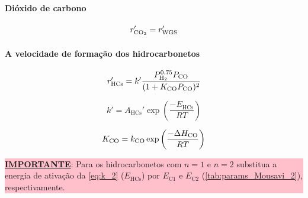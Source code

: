 \documentclass[portuguese,12pt,a4paper,onecolumn]{article}
\begin{document}
	\paragraph{Dióxido de carbono}
	\begin{equation}
		r_{\ce{CO2}}' = r_{\mathrm{WGS}}'
	\end{equation}
	
	\paragraph{A velocidade de formação dos hidrocarbonetos}
	
	\begin{equation}
		r_\mathrm{HCs}' = k' \frac{P_{\ce{H2}}^{0.75} P_{\ce{CO}}}{(1 + K_{\ce{CO}} P_{\ce{CO}})^2}
		\label{eq:r_HCs_2}
	\end{equation}
	
	\begin{equation}
		k' = A_\mathrm{HCs}' \exp \left( \frac{-E_\mathrm{HCs}}{RT} \right)
		\label{eq:k_2}
	\end{equation}
	
	\begin{equation}
		K_{\ce{CO}} = k_{\ce{CO}} \exp \left( \frac{-\Delta H_{\ce{CO}}}{RT} \right)
		\label{eq:K_CO_2}
	\end{equation}
	
	\colorbox{pink}{\parbox{\textwidth}{
			\textbf{\underline{IMPORTANTE}}: Para os hidrocarbonetos com $n = 1$ e $n = 2$ substitua a energia de ativação da \autoref{eq:k_2} ($E_\mathrm{HCs}$) por $E_{\mathrm{C1}}$ e $E_{\mathrm{C2}}$ (\autoref{tab:params_Mousavi_2}), respectivamente.
	}}
	
	\begin{table}[!h]
		\centering
		\caption{Parâmetros das Equações \ref{eq:r_HCs_2}, \ref{eq:k_2} e \ref{eq:K_CO_2}.}
		\label{tab:params_Mousavi_2}
	\end{table}
	
\end{document}
